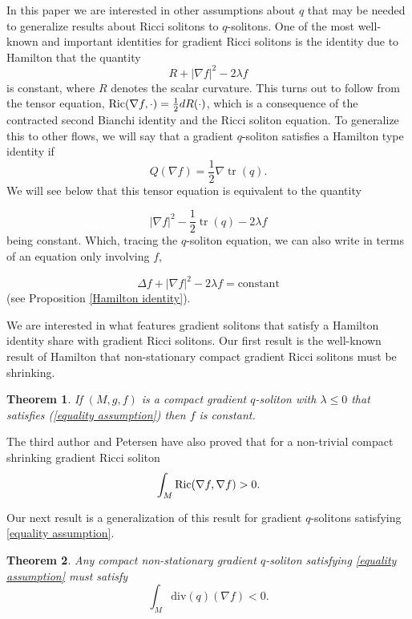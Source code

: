 \documentclass{amsart}
\theoremstyle{plain}
\newtheorem{theorem}{\bf Theorem}[section]
\numberwithin{equation}{section}
\begin{document}
In this paper we are interested in other assumptions about $q$ that may be needed to generalize results about Ricci solitons to $q$-solitons.   One of the most well-known and important identities for gradient Ricci solitons is the identity due to Hamilton \cite{Hamilton} that the quantity  
$$ R +  |\nabla f|^2 - 2\lambda f$$ is constant, where $R$ denotes the scalar curvature. This turns out to follow from the tensor equation, ${\rm Ric}(\nabla f,\cdot)=\frac{1}{2}d R( \cdot) $, which is a consequence of the contracted second Bianchi identity and the Ricci soliton equation.  To generalize this to other flows, we will say that a gradient  $q$-soliton satisfies a Hamilton type identity if 
 \begin{equation}\label{equality assumption}
     Q(\nabla f) =\frac{1}{2}\nabla  \operatorname{tr}(q).
 \end{equation}   We will see below that this tensor equation is equivalent to the quantity
 
$$|\nabla f|^2 - \frac{1}{2}\operatorname{tr}(q)-2\lambda f
$$ being constant.  Which, tracing the $q$-soliton equation, we can also write in terms of an equation only involving $f$,  

$$ \Delta f + |\nabla f|^2 - 2 \lambda f = \text{constant}  $$(see Proposition \ref{Hamilton identity}).  
 

 We are interested in what features gradient solitons that satisfy a Hamilton identity share with gradient Ricci solitons.  Our first result is the well-known result of Hamilton that non-stationary  compact gradient Ricci solitons must be shrinking.

 \begin{theorem}\label{thm01} If $(M,g,f)$ is a compact gradient $q$-soliton  with $\lambda \leq 0$ that satisfies (\ref{equality assumption}) then $f$ is constant. 
 \end{theorem}

The third author and Petersen \cite{WP} have also proved that for a non-trivial compact shrinking gradient Ricci soliton  
$$\int_M{\rm Ric}(\nabla f,\nabla f)>0.$$

 Our next result is a generalization of this result  for gradient $q$-solitons satisfying \eqref{equality assumption}.
 
\begin{theorem}\label{thm03}
Any compact non-stationary gradient $q$-soliton satisfying \eqref{equality assumption} must satisfy $$\int_M  \mathrm{div}(q)(\nabla f)< 0.$$
\end{theorem}
\end{document}
